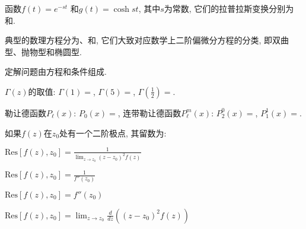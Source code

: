 \documentclass{njustexam}
\begin{document}
  \begin{problem}
  函数$f(t) = e^{-st}$ 和$g(t)=\cosh{st}$, 其中$s$为常数, 它们的拉普拉斯变换分别为 和.
  \end{problem}
  
  \begin{problem}
  典型的数理方程分为、和, 它们大致对应数学上二阶偏微分方程的分类, 即双曲型、抛物型和椭圆型. 
  \end{problem}
  
  \begin{problem}
  定解问题由方程和条件组成. 
  \end{problem}
  
  \begin{problem}
  $\Gamma(z)$的取值: $\Gamma(1)=$, $\Gamma(5)=$, $\Gamma(\frac{1}{2})= $\fillout{$\sqrt{\pi}$}.
  \end{problem}
  
  \begin{problem}
  勒让德函数$P_\ell(x)$:
  $P_0(x) = $, 连带勒让德函数$P_\ell^m(x)$: $P^0_2(x) = $,
  $P^1_1(x) = $. 
  \end{problem}
  
  
  


\begin{problem}
  如果$f(z)$在$z_0$处有一个二阶极点, 其留数为:
  \begin{abcd}
  \item $\text{Res}[f(z),  z_0] = \frac{1}{\lim_{z \to z_0} (z - z_0)^2 f(z)}$
  \item $\text{Res}[f(z),  z_0] = \frac{1}{f''(z_0)}$
  \item $\text{Res}[f(z),  z_0] = f''(z_0)$
  \item $\text{Res}[f(z),  z_0] = \lim_{z \to z_0} \frac{d}{dz} \left( (z - z_0)^2 f(z) \right)$
  \end{abcd}
  \end{problem}

\end{document}
